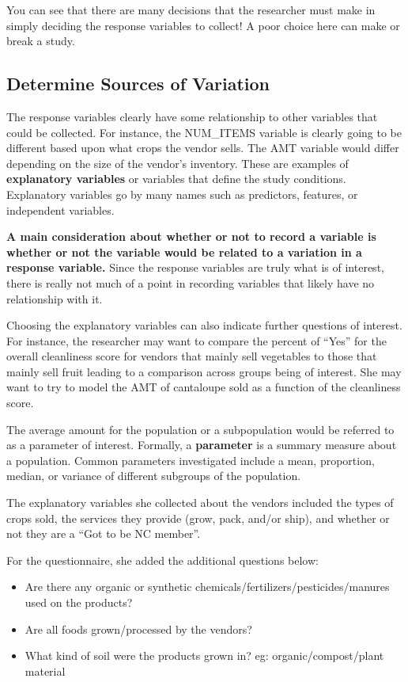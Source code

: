 \documentclass[
]{book}
\providecommand{\tightlist}{%
  \setlength{\itemsep}{0pt}\setlength{\parskip}{0pt}}
\theoremstyle{definition}
\theoremstyle{definition}
\theoremstyle{definition}
\theoremstyle{remark}
\begin{document}
You can see that there are many decisions that the researcher must make in simply deciding the response variables to collect! A poor choice here can make or break a study.

\hypertarget{determine-sources-of-variation}{%
\subsection{Determine Sources of Variation}\label{determine-sources-of-variation}}

The response variables clearly have some relationship to other variables that could be collected. For instance, the NUM\_ITEMS variable is clearly going to be different based upon what crops the vendor sells. The AMT variable would differ depending on the size of the vendor's inventory. These are examples of \textbf{explanatory variables} or variables that define the study conditions. Explanatory variables go by many names such as predictors, features, or independent variables.

\textbf{A main consideration about whether or not to record a variable is whether or not the variable would be related to a variation in a response variable.} Since the response variables are truly what is of interest, there is really not much of a point in recording variables that likely have no relationship with it.

Choosing the explanatory variables can also indicate further questions of interest. For instance, the researcher may want to compare the percent of ``Yes'' for the overall cleanliness score for vendors that mainly sell vegetables to those that mainly sell fruit leading to a comparison across groups being of interest. She may want to try to model the AMT of cantaloupe sold as a function of the cleanliness score.

The average amount for the population or a subpopulation would be referred to as a parameter of interest. Formally, a \textbf{parameter} is a summary measure about a population. Common parameters investigated include a mean, proportion, median, or variance of different subgroups of the population.

The explanatory variables she collected about the vendors included the types of crops sold, the services they provide (grow, pack, and/or ship), and whether or not they are a ``Got to be NC member''.

For the questionnaire, she added the additional questions below:

\begin{itemize}
\tightlist
\item
  Are there any organic or synthetic chemicals/fertilizers/pesticides/manures used on the products?\\
\item
  Are all foods grown/processed by the vendors?\\
\item
  What kind of soil were the products grown in? eg: organic/compost/plant material
\end{itemize}
\end{document}
